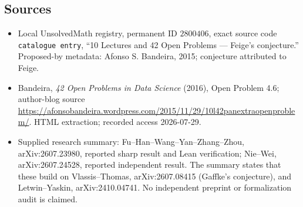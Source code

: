 \documentclass[11pt]{article}
\begin{document}
\subsection{Sources}
\begin{itemize}
\item Local UnsolvedMath registry, permanent ID \(2800406\), exact source code \texttt{catalogue entry}, ``10 Lectures and 42 Open Problems --- Feige's conjecture.'' Proposed-by metadata: Afonso S. Bandeira, 2015; conjecture attributed to Feige.
\item Bandeira, \emph{42 Open Problems in Data Science} (2016), Open Problem 4.6; author-blog source \url{https://afonsobandeira.wordpress.com/2015/11/29/10l42panextraopenproblem/}. HTML extraction; recorded access 2026-07-29.
\item Supplied research summary: Fu--Han--Wang--Yan--Zhang--Zhou, arXiv:2607.23980, reported sharp result and Lean verification; Nie--Wei, arXiv:2607.24528, reported independent result. The summary states that these build on Vlassis--Thomas, arXiv:2607.08415 (Gaffke's conjecture), and Letwin--Yaskin, arXiv:2410.04741. No independent preprint or formalization audit is claimed.
\end{itemize}
\end{document}
